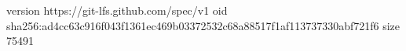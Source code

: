 version https://git-lfs.github.com/spec/v1
oid sha256:ad4cc63c916f043f1361ec469b03372532c68a88517f1af113737330abf721f6
size 75491

